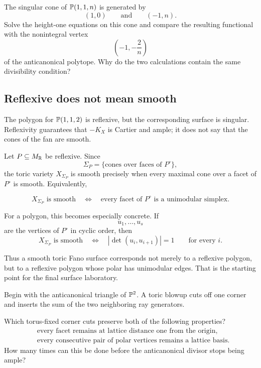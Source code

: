\begin{pauseandthink}
The singular cone of \(\mathbb{P}(1,1,n)\) is generated by
\[
(1,0)
\qquad\text{and}\qquad
(-1,n).
\]
Solve the height-one equations on this cone and compare the resulting
functional with the nonintegral vertex
\[
\left(-1,-\frac{2}{n}\right)
\]
of the anticanonical polytope. Why do the two calculations contain the
same divisibility condition?
\end{pauseandthink}

\subsection{Reflexive does not mean smooth}

The polygon for \(\mathbb{P}(1,1,2)\) is reflexive, but the corresponding
surface is singular. Reflexivity guarantees that \(-K_X\) is Cartier
and ample; it does not say that the cones of the fan are smooth.

Let \(P\subseteq M_{\mathbb{R}}\) be reflexive. Since
\[
\Sigma_P
=
\{\text{cones over faces of }P^\circ\},
\]
the toric variety \(X_{\Sigma_P}\) is smooth precisely when every
maximal cone over a facet of \(P^\circ\) is smooth. Equivalently,

\[
\boxed{
X_{\Sigma_P}\text{ is smooth}
\quad\Longleftrightarrow\quad
\text{every facet of }P^\circ
\text{ is a unimodular simplex.}
}
\]

For a polygon, this becomes especially concrete. If
\[
u_1,\dots,u_s
\]
are the vertices of \(P^\circ\) in cyclic order, then
\[
X_{\Sigma_P}\text{ is smooth}
\quad\Longleftrightarrow\quad
|\det(u_i,u_{i+1})|=1
\qquad
\text{for every }i.
\]

Thus a smooth toric Fano surface corresponds not merely to a reflexive
polygon, but to a reflexive polygon whose polar has unimodular edges.
That is the starting point for the final surface laboratory.

\begin{prediction}
Begin with the anticanonical triangle of \(\mathbb{P}^2\). A toric blowup cuts
off one corner and inserts the sum of the two neighboring ray
generators.

Which torus-fixed corner cuts preserve both of the following
properties?
\[
\begin{aligned}
&\text{every facet remains at lattice distance one from the origin},\\
&\text{every consecutive pair of polar vertices remains a lattice basis}.
\end{aligned}
\]
How many times can this be done before the anticanonical divisor stops
being ample?
\end{prediction}


